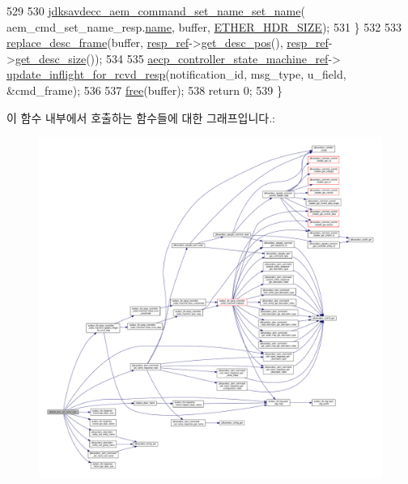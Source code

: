 \begin{DoxyCode}
529 
530         \hyperlink{group__command__set__name_ga49b59c695339c3f6e2fcc1f83d6e410f}{jdksavdecc\_aem\_command\_set\_name\_set\_name}(
      aem\_cmd\_set\_name\_resp.\hyperlink{structjdksavdecc__aem__command__set__name__response_a7e615b51b7768e9b59bfa450051e0f8e}{name}, buffer, \hyperlink{namespaceavdecc__lib_a6c827b1a0d973e18119c5e3da518e65ca9512ad9b34302ba7048d88197e0a2dc0}{ETHER\_HDR\_SIZE});
531     \}
532 
533     \hyperlink{classavdecc__lib_1_1descriptor__base__imp_a8dbf7d4faedf36ec789d33f228e22039}{replace\_desc\_frame}(buffer, \hyperlink{classavdecc__lib_1_1descriptor__base__imp_a2642e3a7c10d38553e7ff4a55e875346}{resp\_ref}->\hyperlink{classavdecc__lib_1_1response__frame_a6e6f6cc3d681d41c6de6139ca9cb79d9}{get\_desc\_pos}(), 
      \hyperlink{classavdecc__lib_1_1descriptor__base__imp_a2642e3a7c10d38553e7ff4a55e875346}{resp\_ref}->\hyperlink{classavdecc__lib_1_1response__frame_a5302ae13c549f066040ce0e7c7d11ae6}{get\_desc\_size}());
534 
535     \hyperlink{namespaceavdecc__lib_a0b1b5aea3c0490f77cbfd9178af5be22}{aecp\_controller\_state\_machine\_ref}->
      \hyperlink{classavdecc__lib_1_1aecp__controller__state__machine_a997abd9786c330a5505e903e6443208e}{update\_inflight\_for\_rcvd\_resp}(notification\_id, msg\_type, u\_field, &cmd\_frame);
536 
537     \hyperlink{_memory_leak_detector_malloc_macros_8h_aa7157aa9480bb73f090dca36776419bf}{free}(buffer);
538     \textcolor{keywordflow}{return} 0;
539 \}
\end{DoxyCode}


이 함수 내부에서 호출하는 함수들에 대한 그래프입니다.\+:
\nopagebreak
\begin{figure}[H]
\begin{center}
\leavevmode
\includegraphics[width=350pt]{classavdecc__lib_1_1descriptor__base__imp_a2f52c3b9a7ad6f490bed0c96a9136bc3_cgraph}
\end{center}
\end{figure}




